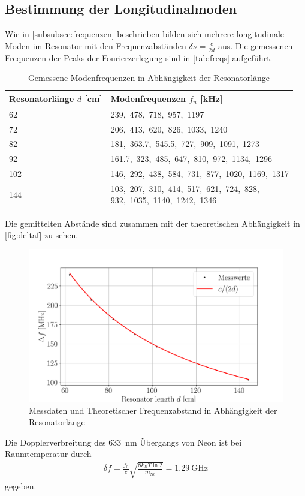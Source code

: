 \subsection{Bestimmung der Longitudinalmoden}
Wie in \autoref{subsubsec:frequenzen} beschrieben bilden sich mehrere longitudinale Moden im Resonator mit den Frequenzabständen $\delta\nu=\frac{c}{2d}$ aus.
Die gemessenen Frequenzen der Peaks der Fourierzerlegung sind in \autoref{tab:freqs} aufgeführt.
\begin{table}[H]
    \centering
    \caption{Gemessene Modenfrequenzen in Abhängigkeit der Resonatorlänge}
    \label{tab:freqs}
    \begin{tabular}{l | l}
      \toprule
      {Resonatorlänge $d$ [\si{\centi\meter}]} & {Modenfrequenzen $f_n$ [\si{\kilo\hertz}]} \\
      \midrule
      62  & 239,\ 478,\ 718,\ 957,\ 1197 \\
      72  & 206,\ 413,\ 620,\ 826,\ 1033,\ 1240 \\
      82  & 181,\ 363.7,\ 545.5,\ 727,\ 909,\ 1091,\ 1273 \\
      92  & 161.7,\ 323,\ 485,\ 647,\ 810,\ 972,\ 1134,\ 1296 \\
      102 & 146,\ 292,\ 438,\ 584,\ 731,\ 877,\ 1020,\ 1169,\ 1317 \\
      144 & \makecell[l]{103,\ 207,\ 310,\ 414,\ 517,\ 621,\ 724,\ 828,\\ 932,\ 1035,\ 1140,\ 1242,\ 1346} \\
      \bottomrule
    \end{tabular}
\end{table}
Die gemittelten Abstände sind zusammen mit der theoretischen Abhängigkeit in \autoref{fig:deltaf} zu sehen.
\begin{figure}[H]
    \centering
    \includegraphics[scale=0.55]{Skripte/deltaf.png}
    \caption{Messdaten und Theoretischer Frequenzabstand in Abhängigkeit der Resonatorlänge}\label{fig:deltaf}
\end{figure}
Die Dopplerverbreitung des \SI{633}{\nano\meter} Übergangs von Neon ist bei Raumtemperatur durch
\begin{align}
    \delta f = \frac{f_0}{c} \sqrt{\frac{8 k_B T \ln 2}{m_\text{Ne}}}=\SI{1.29}{\giga\hertz}
\end{align}
gegeben.
